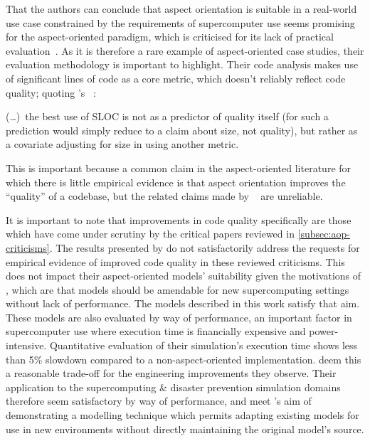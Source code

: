 That the authors can conclude that aspect orientation is suitable in a
real-world use case constrained by the requirements of supercomputer use seems
promising for the aspect-oriented paradigm, which is criticised for its lack of
practical
evaluation~\cite{Constantinides04aopconsidered,steimann06paradoxical,przybylek2010wrong}.
As it is therefore a rare example of aspect-oriented case studies, their
evaluation methodology is important to highlight. Their code analysis makes use
of significant lines of code as a core metric, which doesn't reliably reflect
code quality; quoting \citeauthor{rosenberg1997some}'s ~\cite{rosenberg1997some}:
\begin{displayquote}
    (\ldots{})~the best use of SLOC is not as a predictor of quality
itself (for such a prediction would simply reduce to a claim about size, not
quality), but rather as a covariate adjusting for size in using another
metric.
\end{displayquote}
This is important because a common claim in the aspect-oriented
literature for which there is little empirical evidence is that aspect
orientation improves the ``quality'' of a codebase, but the related claims made
by \citeauthor{ionescu2009aspect}~\cite{ionescu2009aspect} are unreliable.

It is important to note that improvements in code quality specifically are those
which have come under scrutiny by the critical papers reviewed in
\cref{subsec:aop-criticisms}. The results presented by
\citeauthor{ionescu2009aspect} do not satisfactorily address the requests for
empirical evidence of improved code quality in these reviewed criticisms. This
does not impact their aspect-oriented models' suitability given the motivations
of \citeauthor{ionescu2009aspect}, which are that models should be amendable for
new supercomputing settings without lack of performance. The models described in
this work satisfy that aim. These models are also evaluated by way of
performance, an important factor in supercomputer use where execution time is
financially expensive and power-intensive. Quantitative evaluation of their
simulation's execution time shows less than 5\% slowdown compared to a
non-aspect-oriented implementation. \citeauthor{ionescu2009aspect} deem this a
reasonable trade-off for the engineering improvements they observe. Their
application to the supercomputing \& disaster prevention simulation domains
therefore seem satisfactory by way of performance, and meet
\citeauthor{ionescu2009aspect}'s aim of demonstrating a modelling technique
which permits adapting existing models for use in new environments without
directly maintaining the original model's source.

